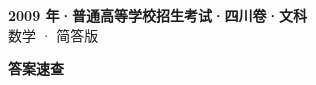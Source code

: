 \documentclass[zihao=-4, a4paper]{ctexart}
\begin{document}
\begin{center}
  {\Large\bfseries 2009 年·普通高等学校招生考试·四川卷·文科}\\[4pt]
  {\large 数学 · 简答版}
\end{center}
\medskip
{}

\clearpage
{}
\begin{center}{\Large\bfseries 答案速查}\end{center}
\medskip

\end{document}
